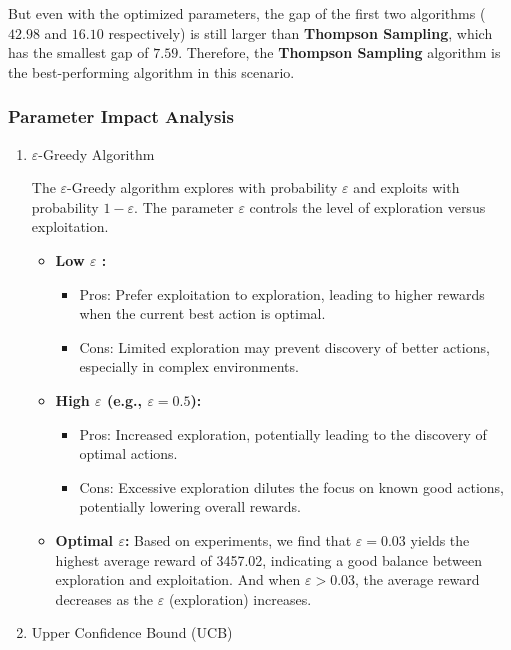 \documentclass[11pt]{article}
\begin{document}
But even with the optimized parameters, the gap of the first two algorithms ($42.98$ and $16.10$ respectively) is still larger than \textbf{Thompson Sampling}, which has the smallest gap of $7.59$. Therefore, the \textbf{Thompson Sampling} algorithm is the best-performing algorithm in this scenario.


\subsubsection*{Parameter Impact Analysis}
\begin{enumerate}[1.]
\item \(\varepsilon\)-Greedy Algorithm

The \(\varepsilon\)-Greedy algorithm explores with probability \(\varepsilon\) and exploits with probability \(1 - \varepsilon\). The parameter \(\varepsilon\) controls the level of exploration versus exploitation.
\begin{itemize}
    \item \textbf{Low \(\varepsilon\) :}
    \begin{itemize}
        \item Pros: Prefer exploitation to exploration, leading to higher rewards when the current best action is optimal.
        \item Cons: Limited exploration may prevent discovery of better actions, especially in complex environments.
    \end{itemize}
    
    \item \textbf{High \(\varepsilon\) (e.g., \(\varepsilon = 0.5\)):}
    \begin{itemize}
        \item Pros: Increased exploration, potentially leading to the discovery of optimal actions.
        \item Cons: Excessive exploration dilutes the focus on known good actions, potentially lowering overall rewards.
    \end{itemize}
    
    \item \textbf{Optimal \(\varepsilon\):} Based on experiments, we find that \(\varepsilon = 0.03\) yields the highest average reward of 3457.02, indicating a good balance between exploration and exploitation. And when \(\varepsilon > 0.03\), the average reward decreases as the $\varepsilon$ (exploration) increases.
\end{itemize}

\item Upper Confidence Bound (UCB)


\end{enumerate}
\end{document}
